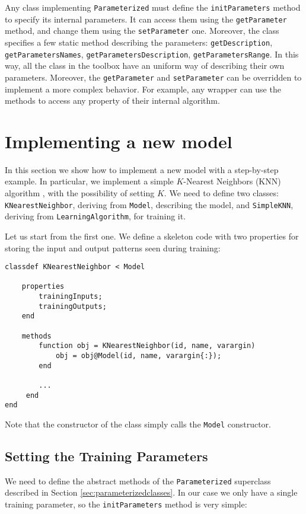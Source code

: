 \noindent Any class implementing \verb|Parameterized| must define the \verb|initParameters| method to specify its internal parameters. It can access them using the \verb|getParameter| method, and change them using the \verb|setParameter| one. Moreover, the class specifies a few static method describing the parameters: \verb|getDescription|, \verb|getParametersNames|, \verb|getParametersDescription|, \verb|getParametersRange|. In this way, all the class in the toolbox have an uniform way of describing their own parameters. Moreover, the \verb|getParameter| and \verb|setParameter| can be overridden to implement a more complex behavior. For example, any wrapper can use the methods to access any property of their internal algorithm.

\section{Implementing a new model}

In this section we show how to implement a new model with a step-by-step example. In particular, we implement a simple $K$-Nearest Neighbors (KNN) algorithm \cite{alpaydin2004introduction}, with the possibility of setting $K$. We need to define two classes: \verb|KNearestNeighbor|, deriving from \verb|Model|, describing the model, and \verb|SimpleKNN|, deriving from \verb|LearningAlgorithm|, for training it.

Let us start from the first one. We define a skeleton code with two properties for storing the input and output patterns seen during training:

\begin{lstlisting}
classdef KNearestNeighbor < Model
    
    properties
        trainingInputs;
        trainingOutputs;
    end
    
    methods
        function obj = KNearestNeighbor(id, name, varargin)
            obj = obj@Model(id, name, varargin{:});
        end
        
        ...
     end
end
\end{lstlisting}

\noindent Note that the constructor of the class simply calls the \verb|Model| constructor.

\subsection{Setting the Training Parameters}

We need to define the abstract methods of the \verb|Parameterized| superclass described in Section \ref{sec:parameterizedclasses}. In our case we only have a single training parameter, so the \verb|initParameters| method is very simple:

